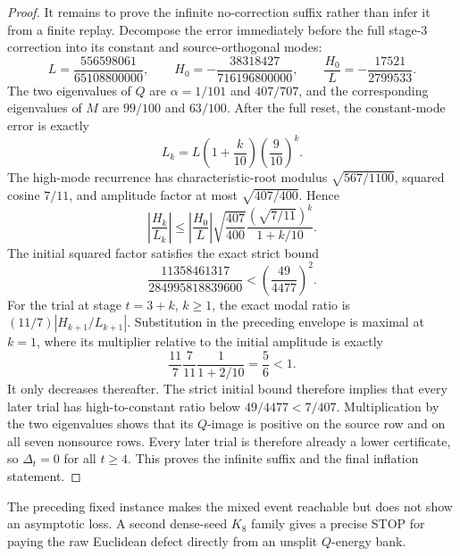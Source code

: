 \begin{proof}
It remains to prove the infinite no-correction suffix rather than infer it
from a finite replay.  Decompose the error immediately before the full
stage-$3$ correction into its constant and source-orthogonal modes:
\begin{equation*}
 L=\frac{556598061}{65108800000},
 \qquad
 H_0=-\frac{38318427}{716196800000},
 \qquad
 \frac{H_0}{L}=-\frac{17521}{2799533}.
\end{equation*}
The two eigenvalues of $Q$ are $\alpha=1/101$ and $407/707$, and the
corresponding eigenvalues of $M$ are $99/100$ and $63/100$.  After the full
reset, the constant-mode error is exactly
\begin{equation*}
 L_k=L\left(1+\frac{k}{10}\right)\left(\frac9{10}\right)^k.
\end{equation*}
The high-mode recurrence has characteristic-root modulus
$\sqrt{567/1100}$, squared cosine $7/11$, and amplitude factor at most
$\sqrt{407/400}$.  Hence
\begin{equation*}
 \left|\frac{H_k}{L_k}\right|
 \leq
 \left|\frac{H_0}{L}\right|\sqrt{\frac{407}{400}}
 \frac{(\sqrt{7/11})^k}{1+k/10}.
\end{equation*}
The initial squared factor satisfies the exact strict bound
\begin{equation*}
 \frac{11358461317}{284995818839600}
 <\left(\frac{49}{4477}\right)^2.
\end{equation*}
For the trial at stage $t=3+k$, $k\geq1$, the exact modal ratio is
$(11/7)|H_{k+1}/L_{k+1}|$.  Substitution in the preceding envelope is
maximal at $k=1$, where its multiplier relative to the initial amplitude is
exactly
\begin{equation*}
 \frac{11}{7}\frac{7}{11}\frac1{1+2/10}=\frac56<1.
\end{equation*}
It only decreases thereafter.  The strict initial bound therefore implies
that every later trial has high-to-constant ratio below $49/4477<7/407$.
Multiplication by
the two eigenvalues shows that its $Q$-image is positive on the source row
and on all seven nonsource rows.  Every later trial is therefore already a
lower certificate, so $\Delta_t=0$ for all $t\geq4$.  This proves the
infinite suffix and the final inflation statement.
\end{proof}

The preceding fixed instance makes the mixed event reachable but does not
show an asymptotic loss.  A second dense-seed $K_8$ family gives a precise
STOP for paying the raw Euclidean defect directly from an unsplit
$Q$-energy bank.

